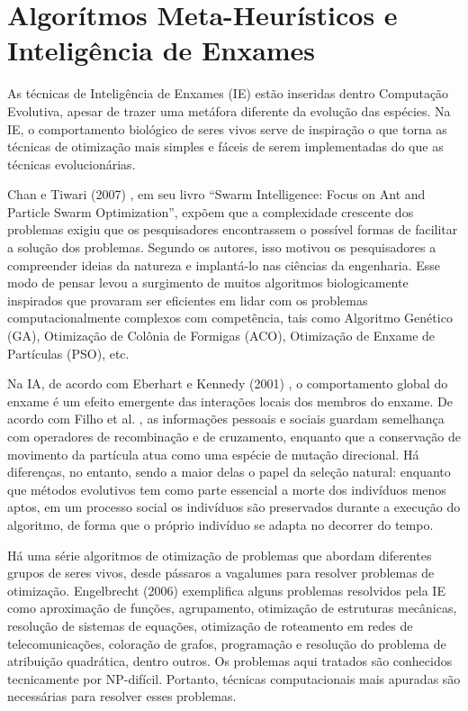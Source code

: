\chapter{Algorítmos Meta-Heurísticos e Inteligência de Enxames}

As técnicas de Inteligência de Enxames (IE) estão inseridas dentro Computação Evolutiva, apesar de trazer uma metáfora diferente da evolução das espécies. Na IE, o comportamento biológico de seres vivos serve de inspiração o que torna as técnicas de otimização mais simples e fáceis de serem implementadas do que as técnicas evolucionárias.

Chan e Tiwari (2007) \cite{chan2007preface}, em seu livro “Swarm Intelligence: Focus on Ant and Particle Swarm Optimization”, expõem que a complexidade crescente dos problemas exigiu que os pesquisadores encontrassem o possível formas de facilitar a solução dos problemas. Segundo os autores, isso motivou os pesquisadores a compreender ideias da natureza e implantá-lo nas ciências da engenharia. Esse modo de pensar levou a surgimento de muitos algoritmos biologicamente inspirados que provaram ser eficientes em lidar com os problemas computacionalmente complexos com competência, tais como Algoritmo Genético (GA), Otimização de Colônia de Formigas (ACO), Otimização de Enxame de Partículas (PSO), etc.

Na IA, de acordo com Eberhart e Kennedy (2001) \cite{eberhart2001swarm}, o comportamento global do enxame é um efeito emergente das interações locais dos membros do enxame. De acordo com Filho et al. \cite{bastos2008novel}, as informações pessoais e sociais guardam semelhança com operadores de recombinação e de cruzamento, enquanto que a conservação de movimento da partícula atua como uma espécie de mutação direcional. Há diferenças, no entanto, sendo a maior delas o papel da seleção natural: enquanto que métodos evolutivos tem como parte essencial a morte dos indivíduos menos aptos, em um processo social os indivíduos são preservados durante a execução do algoritmo, de forma que o próprio indivíduo se adapta no decorrer do tempo.

Há uma série algoritmos de otimização de problemas que abordam diferentes grupos de seres vivos, desde pássaros a vagalumes para resolver problemas de otimização. Engelbrecht (2006) \cite{engelbrecht2006fundamentals} exemplifica alguns problemas resolvidos pela IE como aproximação de funções, agrupamento, otimização de estruturas mecânicas, resolução de sistemas de equações, otimização de roteamento em redes de telecomunicações, coloração de grafos, programação e resolução do problema de atribuição quadrática, dentro outros. Os problemas aqui tratados são conhecidos tecnicamente por NP-difícil. Portanto, técnicas computacionais mais apuradas são necessárias para resolver esses problemas.


